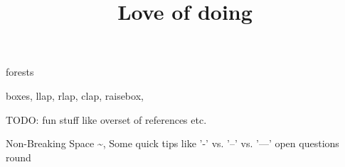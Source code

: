

\title{Love of doing}

\let\oldtitlepage\DoTitlepage
\def\DoTitlepage{}



\makeatletter

\begin{frame}[plain]
   \begin{focus}
   \end{focus}
\end{frame}







\begin{frame}{\insertsection}
   forests
\end{frame}

\begin{frame}{\insertsection}
   boxes, llap, rlap, clap, raisebox,
\end{frame}



\begin{frame}
   \focusCfalse
   \begin{focus}
      \AllLearnings
   \end{focus}
\end{frame}

\appendix
\begin{frame}
   TODO: fun stuff like overset of references etc.
\end{frame}

\begin{frame}
   Non-Breaking Space \textasciitilde,
   Some quick tips like '-' vs. '--' vs. '---'
   open questions round
\end{frame}



